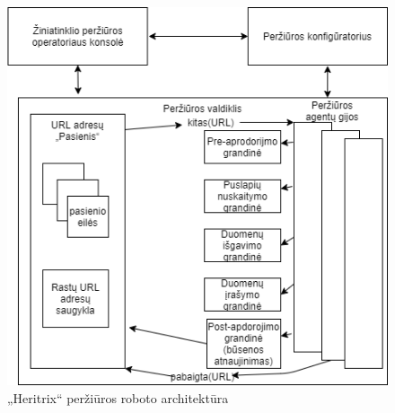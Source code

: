 \begin{figure}[htp!]
\hspace{-1cm}
\centering
\includegraphics[scale=0.6]{img/heritrix.png}
\caption{„Heritrix“ peržiūros roboto architektūra}
\label{fig:heritrix}
\end{figure}